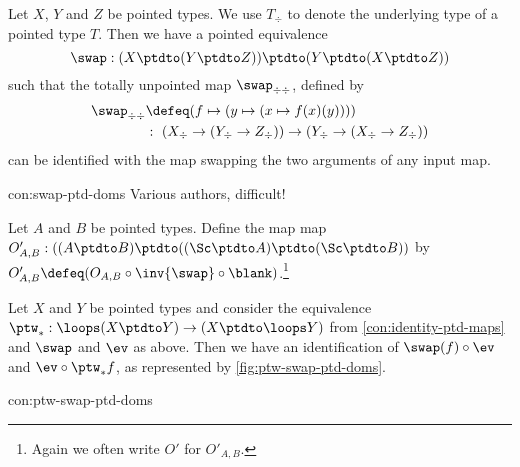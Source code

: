 \begin{construction}\label{con:swap-ptd-doms}
Let $X$, $Y$ and $Z$ be pointed types. We use $T_\div$ to
denote the underlying type of a pointed type $T$.
Then we have a pointed equivalence 
\[
\swap: (X\ptdto (Y\ptdto Z)) \ptdto (Y\ptdto (X\ptdto Z))
\] 
such that the totally unpointed map $\swap_{\div\div}$, defined by
\begin{align*}
\swap_{\div\div}&\defeq (f\mapsto(y\mapsto (x\mapsto f(x)(y)))) \\
 &:~(X_\div\to (Y_\div\to Z_\div))\to(Y_\div\to (X_\div\to Z_\div))
\end{align*}
can be identified with the map swapping the two arguments of any input map. 
\end{construction}
\begin{implementation}{con:swap-ptd-doms}
Various authors, difficult!
\end{implementation}


\begin{definition}\label{def:O'}
Let $A$ and $B$ be pointed types. Define the map
map $O'_{A,B}: ((A\ptdto B)\ptdto((\Sc\ptdto A)\ptdto(\Sc\ptdto B))$
by $O'_{A,B}\defeq (O_{A,B} \circ\inv{\swap}\circ\blank)$.\footnote{%
Again we often write $O'$ for $O'_{A,B}$.} 
 \end{definition}

\begin{marginfigure}
  \caption{\label{fig:ptw-swap-ptd-doms} 
  Domain swap and $\protect\ptw_*$ correspond.} 
\end{marginfigure}

\begin{construction}\label{con:ptw-swap-ptd-doms}
Let $X$ and $Y$ be pointed types and 
consider the equivalence $\ptw_*: \loops(X\ptdto Y) \to (X\ptdto \loops Y)$
from \cref{con:identity-ptd-maps} and $\swap$ and $\ev$ as above. 
Then we have an identification of $\swap(f)\circ \ev$ 
and $\ev \circ \ptw_* f$, as represented by \cref{fig:ptw-swap-ptd-doms}.
\end{construction}
\begin{implementation}{con:ptw-swap-ptd-doms}
\end{implementation}

